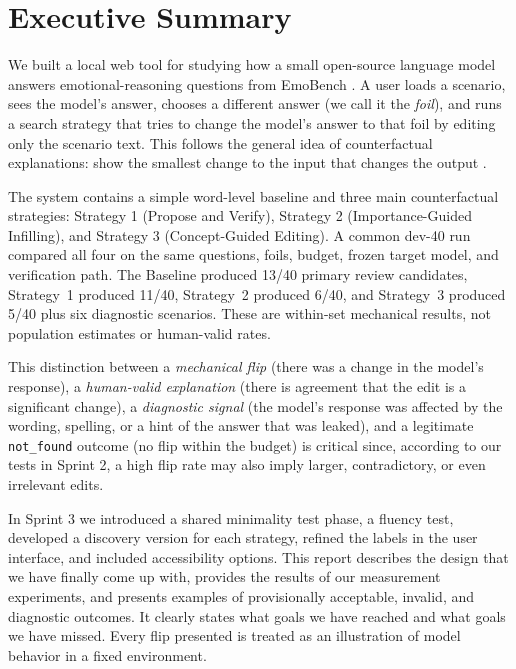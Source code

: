 \documentclass[11pt,a4paper]{article}
\newcommand{\stratone}{Strategy 1 (Propose and Verify)}
\newcommand{\strattwo}{Strategy 2 (Importance-Guided Infilling)}
\newcommand{\stratthree}{Strategy 3 (Concept-Guided Editing)}
\begin{document}
\tableofcontents
\newpage
{}

\section*{Executive Summary}

We built a local web tool for studying how a small open-source language model answers
emotional-reasoning questions from EmoBench \cite{sabour2024}. A user loads a scenario,
sees the model's answer, chooses a different answer (we call it the \emph{foil}), and
runs a search strategy that tries to change the model's answer to that foil by editing
only the scenario text. This follows the general idea of counterfactual explanations:
show the smallest change to the input that changes the output
\cite{wachter2018,miller2019}.

The system contains a simple word-level baseline and three main counterfactual
strategies: \stratone{}, \strattwo{}, and \stratthree{}. A common dev-40 run compared
all four on the same questions, foils, budget, frozen target model, and verification
path. The Baseline produced 13/40 primary review candidates, Strategy~1 produced
11/40, Strategy~2 produced 6/40, and Strategy~3 produced 5/40 plus six diagnostic
scenarios. These are within-set mechanical results, not population estimates or
human-valid rates.

This distinction between a \emph{mechanical flip} (there was a change in the model's
response), a \emph{human-valid explanation} (there is agreement that the edit is a
significant change), a \emph{diagnostic signal} (the model's response was affected by
the wording, spelling, or a hint of the answer that was leaked), and a legitimate
\texttt{not\_found} outcome (no flip within the budget) is critical since, according
to our tests in Sprint 2, a high flip rate may also imply larger, contradictory, or
even irrelevant edits.

In Sprint 3 we introduced a shared minimality test phase, a fluency test, developed a
discovery version for each strategy, refined the labels in the user interface, and
included accessibility options. This report describes the design that we have finally
come up with, provides the results of our measurement experiments, and presents
examples of provisionally acceptable, invalid, and diagnostic outcomes. It clearly
states what goals we have reached and what goals we have missed. Every flip presented
is treated as an illustration of model behavior in a fixed environment.
\end{document}
